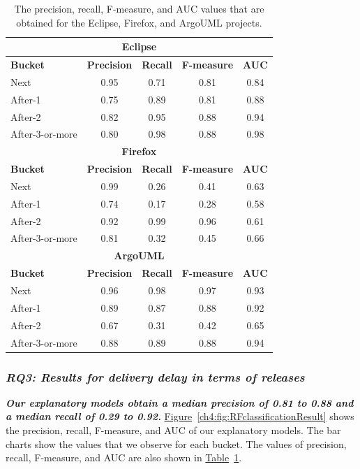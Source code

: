 \begin{table}
	\footnotesize
	\centering
	\caption{The precision, recall, F-measure, and AUC values that are
	obtained for the Eclipse, Firefox, and ArgoUML projects. 
	\label{ch4:tbl:evaluation_metrics}
	}
	\begin{tabular}{lcccc}
		\hline
		\multicolumn{5}{c}{\textbf{Eclipse}}\tabularnewline
		\hline 
		\textbf{Bucket} & \textbf{Precision} & \textbf{Recall} &
		\textbf{F-measure} & \textbf{AUC}\tabularnewline
		\hline 
		Next & 0.95  & 0.71  & 0.81 & 0.84 \tabularnewline
		\hline 
		After-1 & 0.75 & 0.89 & 0.81 & 0.88\tabularnewline
		\hline 
		After-2 & 0.82 & 0.95 & 0.88 & 0.94\tabularnewline
		\hline 
		After-3-or-more & 0.80 & 0.98 & 0.88 & 0.98\tabularnewline
		\hline 
		\hline
		\multicolumn{5}{c}{\textbf{Firefox}}\tabularnewline
		\hline 
		\textbf{Bucket} & \textbf{Precision} & \textbf{Recall} &
		\textbf{F-measure} & \textbf{AUC}\tabularnewline
		\hline 
		Next & 0.99  & 0.26  & 0.41 & 0.63 \tabularnewline
		\hline 
		After-1 & 0.74 & 0.17 & 0.28 & 0.58\tabularnewline
		\hline 
		After-2 & 0.92 & 0.99 & 0.96 & 0.61\tabularnewline
		\hline 
		After-3-or-more & 0.81 & 0.32 & 0.45 & 0.66\tabularnewline
		\hline 
		\hline
		\multicolumn{5}{c}{\textbf{ArgoUML}}\tabularnewline
		\hline 
		\textbf{Bucket} & \textbf{Precision} & \textbf{Recall} &
		\textbf{F-measure} & \textbf{AUC}\tabularnewline
		\hline 
		Next & 0.96  & 0.98  & 0.97 & 0.93 \tabularnewline
		\hline 
		After-1 & 0.89 & 0.87 & 0.88 & 0.92\tabularnewline
		\hline 
		After-2 & 0.67 & 0.31 & 0.42 & 0.65\tabularnewline
		\hline 
		After-3-or-more & 0.88 & 0.89 & 0.88 & 0.94\tabularnewline
		\hline 
	\end{tabular}
\end{table}

\subsubsection*{\textit{\textbf{RQ3: Results for delivery delay in terms of
releases}}}

\noindent\textit{\textbf{Our explanatory models obtain a median precision of 0.81 to
0.88 and a median recall of 0.29 to 0.92.}}
\hyperref[ch4:fig:RFclassificationResult]{Figure}~\ref{ch4:fig:RFclassificationResult}
shows the precision, recall, F-measure, and AUC of our explanatory models.  The
bar charts show the values that we observe for each bucket. The values of
precision, recall, F-measure, and AUC are also shown in
\hyperref[ch4:tbl:evaluation_metrics]{Table}~\ref{ch4:tbl:evaluation_metrics}. 

